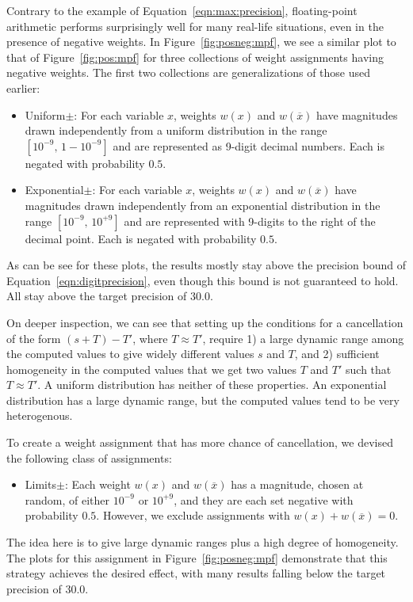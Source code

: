 \documentclass[letterpaper,USenglish,cleveref, autoref, thm-restate]{lipics-v2021}
\newcommand{\obar}[1]{\overline{#1}}
\begin{document}
Contrary to the example of
Equation~\ref{eqn:max:precision},
floating-point arithmetic performs surprisingly well for
many real-life
situations, even in the presence of negative weights.
In Figure~\ref{fig:posneg:mpf}, we see a similar plot to that of Figure~\ref{fig:pos:mpf} for
three collections of weight assignments having negative weights.  The first two collections are generalizations of those used earlier:
\begin{itemize}
\item \textsf{Uniform$\pm$}: For each variable $x$, weights $w(x)$ and $w(\obar{x})$ have magnitudes drawn independently
from a uniform distribution in the range  $[10^{-9},\,1-10^{-9}]$ and are represented as 9-digit decimal numbers.  Each is negated with probability $0.5$.
\item \textsf{Exponential$\pm$}: For each variable $x$, weights $w(x)$ and $w(\obar{x})$ have magnitudes
  drawn independently from an exponential distribution in the range $[10^{-9},\,10^{+9}]$ and are represented with 9-digits to the right of the decimal point.  Each is negated with probability $0.5$.
\end{itemize}
As can be see for these plots, the results mostly stay above the precision bound of Equation~\ref{eqn:digitprecision},
even though this bound is not guaranteed to hold.  All stay above the target precision of $30.0$.

On deeper inspection, we can see that setting up the conditions for a
cancellation of the form $(s + T) - T'$, where $T \approx T'$, require
1) a large dynamic range among the computed values to give widely different values $s$ and $T$, and 2) sufficient
homogeneity in the computed values that we get two values $T$ and
$T'$ such that $T \approx T'$.  A uniform distribution has neither of
these properties.  An exponential distribution has a large dynamic
range, but the computed values tend to be very heterogenous.

To create a weight assignment that has more chance of cancellation, we devised the following class of assignments:
\begin{itemize}
\item\textsf{Limits$\pm$}:  Each weight $w(x)$ and $w(\obar{x})$ has a magnitude, chosen at random, of either $10^{-9}$ or $10^{+9}$, and they are each set negative with probability $0.5$.
  However, we exclude assignments with $w(x) + w(\obar{x}) = 0$.
\end{itemize}
The idea here is to give large dynamic ranges plus a high degree of
homogeneity.  The plots for this assignment in
Figure~\ref{fig:posneg:mpf} demonstrate that this strategy achieves
the desired effect, with many results falling below the target precision of $30.0$.
\end{document}
